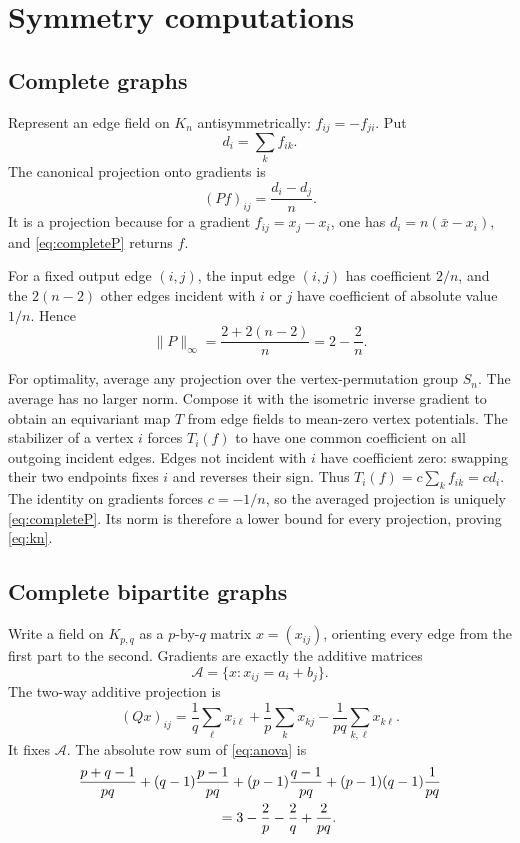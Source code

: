 \documentclass[11pt]{article}
\begin{document}
\section{Symmetry computations}

\subsection{Complete graphs}

Represent an edge field on \(K_n\) antisymmetrically:
\(f_{ij}=-f_{ji}\).  Put
\[
 d_i=\sum_k f_{ik}.
\]
The canonical projection onto gradients is
\begin{equation}\label{eq:completeP}
 (Pf)_{ij}=\frac{d_i-d_j}{n}.
\end{equation}
It is a projection because for a gradient \(f_{ij}=x_j-x_i\), one has
\(d_i=n(\bar x-x_i)\), and \eqref{eq:completeP} returns \(f\).

For a fixed output edge \((i,j)\), the input edge \((i,j)\) has coefficient
\(2/n\), and the \(2(n-2)\) other edges incident with \(i\) or \(j\) have
coefficient of absolute value \(1/n\).  Hence
\[
 \|P\|_\infty=\frac{2+2(n-2)}n=2-\frac2n.
\]

For optimality, average any projection over the vertex-permutation group
\(S_n\).  The average has no larger norm.  Compose it with the isometric
inverse gradient to obtain an equivariant map \(T\) from edge fields to
mean-zero vertex potentials.  The stabilizer of a vertex \(i\) forces
\(T_i(f)\) to have one common coefficient on all outgoing incident edges.
Edges not incident with \(i\) have coefficient zero: swapping their two
endpoints fixes \(i\) and reverses their sign.  Thus
\(T_i(f)=c\sum_k f_{ik}=c d_i\).  The identity on gradients forces
\(c=-1/n\), so the averaged projection is uniquely \eqref{eq:completeP}.
Its norm is therefore a lower bound for every projection, proving
\eqref{eq:kn}.

\subsection{Complete bipartite graphs}

Write a field on \(K_{p,q}\) as a \(p\)-by-\(q\) matrix \(x=(x_{ij})\),
orienting every edge from the first part to the second.  Gradients are
exactly the additive matrices
\[
 \mathcal A=\{x:x_{ij}=a_i+b_j\}.
\]
The two-way additive projection is
\begin{equation}\label{eq:anova}
 (Qx)_{ij}=\frac1q\sum_{\ell}x_{i\ell}
 +\frac1p\sum_kx_{kj}
 -\frac1{pq}\sum_{k,\ell}x_{k\ell}.
\end{equation}
It fixes \(\mathcal A\).  The absolute row sum of \eqref{eq:anova} is
\begin{align*}
 &\frac{p+q-1}{pq}
 +(q-1)\frac{p-1}{pq}
 +(p-1)\frac{q-1}{pq}
 +(p-1)(q-1)\frac1{pq}\\
 &\hspace{35mm}=3-\frac2p-\frac2q+\frac{2}{pq}.
\end{align*}
\end{document}
